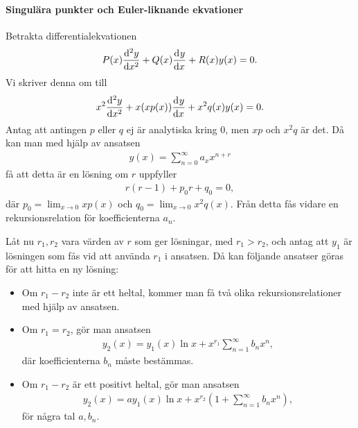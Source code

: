 \paragraph{Singulära punkter och Euler-liknande ekvationer}
Betrakta differentialekvationen
\begin{align*}
	P(x)\dv[2]{y}{x} (x) + Q(x)\dv[]{y}{x} (x) + R(x)y(x) = 0.
\end{align*}
Vi skriver denna om till
\begin{align*}
	x^{2}\dv[2]{y}{x} (x) + x(xp(x))\dv[]{y}{x} (x) + x^{2}q(x)y(x) = 0.
\end{align*}
Antag att antingen $p$ eller $q$ ej är analytiska kring $0$, men $xp$ och $x^{2}q$ är det. Då kan man med hjälp av ansatsen
\begin{align*}
	y(x) = \sum\limits_{n = 0}^{\infty}a_{x}x^{n + r}
\end{align*}
få att detta är en lösning om $r$ uppfyller
\begin{align*}
	r(r - 1) + p_{0}r + q_{0} = 0,
\end{align*}
där $p_{0} = \lim_{x\to 0}xp(x)$ och $q_{0} = \lim_{x\to 0}x^{2}q(x)$. Från detta fås vidare en rekursionsrelation för koefficienterna $a_{n}$.

Låt nu $r_{1}, r_{2}$ vara värden av $r$ som ger lösningar, med $r_{1} > r_{2}$, och antag att $y_{1}$ är lösningen som fås vid att använda $r_{1}$ i ansatsen. Då kan följande ansatser göras för att hitta en ny lösning:
\begin{itemize}
	\item Om $r_{1} - r_{2}$ inte är ett heltal, kommer man få två olika rekursionsrelationer med hjälp av ansatsen.
	\item Om $r_{1} = r_{2}$, gör man ansatsen
	\begin{align*}
		y_{2}(x) = y_{1}(x)\ln{x} + x^{r_{1}}\sum\limits_{n = 1}^{\infty}b_{n}x^{n},
	\end{align*}
	där koefficienterna $b_{n}$ måste bestämmas.
	\item Om $r_{1} - r_{2}$ är ett positivt heltal, gör man ansatsen
	\begin{align*}
		y_{2}(x) = ay_{1}(x)\ln{x} + x^{r_{2}}\left(1 + \sum\limits_{n = 1}^{\infty}b_{n}x^{n}\right),
	\end{align*}
	för några tal $a, b_{n}$.
\end{itemize}

